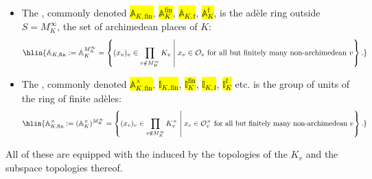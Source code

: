 \begin{definition}
\begin{itemize}
    \item The , commonly denoted \hl{$\mathbb{A}_{K, \mathrm{fin}}$}, \hl{$\mathbb{A}_{K}^{\mathrm{fin}}$}, \hl{$\mathbb{A}_{K, \mathrm{f}}$}, \hl{$\mathbb{A}_{K}^{\mathrm{f}}$}, is the adèle ring outside $S = M_K^\infty$, the set of archimedean places of $K$:
    $$\hlin{\mathbb{A}_{K, \mathrm{fin}} := \mathbb{A}_K^{M_K^\infty} = \left\{ (x_v)_v \in \prod_{v \notin M_K^\infty} K_v \;\middle|\; x_v \in \mathcal{O}_v \text{ for all but finitely many non-archimedean } v \right\}.} $$

    \item The , commonly denoted \hl{$\mathbb{A}_{K, \mathrm{fin}}^\times$}, \hl{$\mathbb{I}_{K, \mathrm{fin}}$}, \hl{$\mathbb{I}_{K}^{\mathrm{fin}}$}, \hl{$\mathbb{I}_{K, \mathrm{f}}$}, \hl{$\mathbb{I}_{K}^{\mathrm{f}}$} etc.  is the group of units of the ring of finite adèles:
    $$\hlin{\mathbb{A}_{K, \mathrm{fin}}^\times := (\mathbb{A}_K^\times)^{M_K^\infty} = \left\{ (x_v)_v \in \prod_{v \notin M_K^\infty} K_v^\times \;\middle|\; x_v \in \mathcal{O}_v^\times \text{ for all but finitely many non-archimedean } v \right\}.}$$

\end{itemize}
All of these are equipped with the  induced by the topologies of the  $K_v$ and the subspace topologies thereof.
\end{definition}
